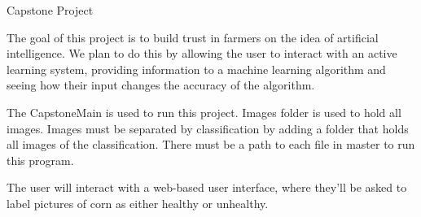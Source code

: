 Capstone Project

The goal of this project is to build trust in farmers on the idea of artificial intelligence. We plan to do this by allowing the user to interact with an active learning system, providing information to a machine learning algorithm and seeing how their input changes the accuracy of the algorithm.

The Capstone\+Main is used to run this project. Images folder is used to hold all images. Images must be separated by classification by adding a folder that holds all images of the classification. There must be a path to each file in master to run this program.

The user will interact with a web-\/based user interface, where they’ll be asked to label pictures of corn as either healthy or unhealthy. 